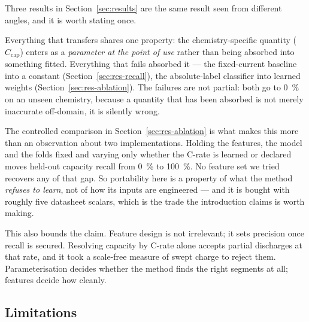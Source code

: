 \documentclass[preprint,3p,number]{elsarticle}
\begin{document}
Three results in Section~\ref{sec:results} are the same result seen from
different angles, and it is worth stating once.

Everything that transfers shares one property: the chemistry-specific quantity
($C_{\mathrm{cap}}$) enters as a \emph{parameter at the point of use} rather
than being absorbed into something fitted. Everything that fails absorbed it ---
the fixed-current baseline into a constant
(Section~\ref{sec:res-recall}), the absolute-label classifier into learned
weights (Section~\ref{sec:res-ablation}). The failures are not partial: both go
to \SI{0}{\percent} on an unseen chemistry, because a quantity that has been
absorbed is not merely inaccurate off-domain, it is silently wrong.

The controlled comparison in Section~\ref{sec:res-ablation} is what makes this
more than an observation about two implementations. Holding the features, the
model and the folds fixed and varying only whether the C-rate is learned or
declared moves held-out capacity recall from \SI{0}{\percent} to
\SI{100}{\percent}. No feature set we tried recovers any of that gap. So
portability here is a property of what the method \emph{refuses to learn}, not
of how its inputs are engineered --- and it is bought with roughly five
datasheet scalars, which is the trade the introduction claims is worth making.

This also bounds the claim. Feature design is not irrelevant; it sets precision
once recall is secured. Resolving capacity by C-rate alone accepts partial
discharges at that rate, and it took a scale-free measure of swept charge to
reject them. Parameterisation decides whether the method finds the right
segments at all; features decide how cleanly.

\subsection{Limitations}
\end{document}
